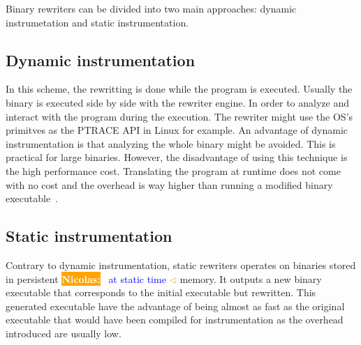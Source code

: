 \documentclass[a4paper,11pt,oneside]{report}
\newcommand{\todobox}[3]{%
    \colorbox{#1}{\textcolor{white}{\sffamily\bfseries\scriptsize #2}}%
    ~\textcolor{blue}{#3} %
    \textcolor{#1}{$\triangleleft$}%
}
\newcommand{\nb}[1]{\todobox{orange}{Nicolas:}{#1}}
\begin{document}
Binary rewriters can be divided into two main approaches: dynamic
instrumetation and static instrumentation.

\subsection{Dynamic instrumentation}
In this scheme, the rewritting is done while the program is executed. Usually
the binary is executed side by side with the rewriter engine. In order to
analyze and interact with the program during the execution. The rewriter might
use the OS's primitves as the PTRACE API in Linux for example.  An advantage of
dynamic instrumentation is that analyzing the whole binary might be avoided.
This is practical for large binaries. However, the disadvantage of using this
technique is the high performance cost. Translating the program at runtime does
not come with no cost and the overhead is way higher than running a modified
binary executable~\cite{dinesh20oakland}.


\subsection{Static instrumentation}
Contrary to dynamic instrumentation, static rewriters operates on binaries
stored in persistent \nb{at static time } memory. It outputs a new binary
executable that corresponds to the initial executable but rewritten. This
generated executable have the advantage of being almost as fast as the original
executable that would have been compiled for instrumentation as the overhead
introduced are usually low.
\end{document}
